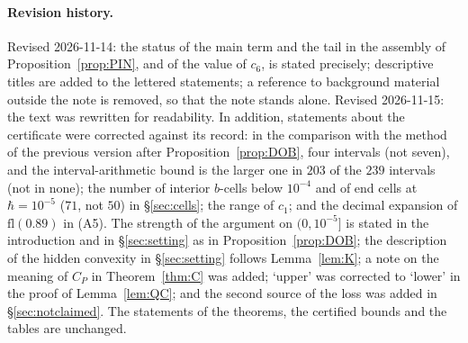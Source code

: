 \documentclass[11pt,a4paper]{article}
\theoremstyle{definition}
\theoremstyle{remark}
\begin{document}
\paragraph{Revision history.} Revised 2026-11-14: the status of the main term and the tail in the assembly of Proposition~\ref{prop:PIN}, and of the value of $c_6$, is stated precisely; descriptive titles are added to the lettered statements; a reference to background material outside the note is removed, so that the note stands alone. Revised 2026-11-15: the text was rewritten for readability. In addition, statements about the certificate were corrected against its record: in the comparison with the method of the previous version after Proposition~\ref{prop:DOB}, four intervals (not seven), and the interval-arithmetic bound is the larger one in $203$ of the $239$ intervals (not in none); the number of interior $b$-cells below $10^{-4}$ and of end cells at $\hbar=10^{-5}$ ($71$, not $50$) in \S\ref{sec:cells}; the range of $c_1$; and the decimal expansion of $\mathrm{fl}(0.89)$ in (A5). The strength of the argument on $(0,10^{-5}]$ is stated in the introduction and in \S\ref{sec:setting} as in Proposition~\ref{prop:DOB}; the description of the hidden convexity in \S\ref{sec:setting} follows Lemma~\ref{lem:K}; a note on the meaning of $C_P$ in Theorem~\ref{thm:C} was added; `upper' was corrected to `lower' in the proof of Lemma~\ref{lem:QC}; and the second source of the loss was added in \S\ref{sec:notclaimed}. The statements of the theorems, the certified bounds and the tables are unchanged.
\end{document}
